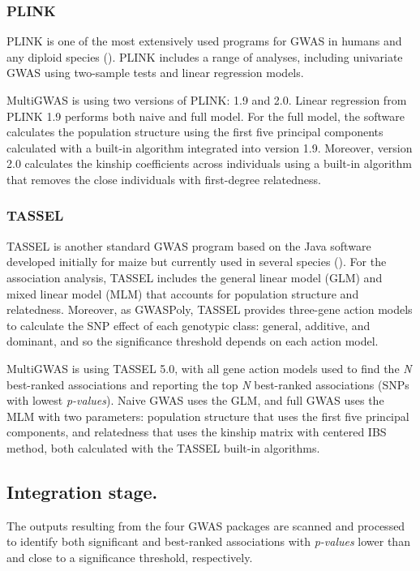 \documentclass{article}
\begin{document}
\subsubsection{PLINK}
PLINK is one of the most extensively used programs for GWAS in humans and any diploid species (\cite{Power2016}). PLINK includes a range of analyses, including univariate GWAS using two-sample tests and linear regression models.

MultiGWAS is using two versions of PLINK: 1.9 and 2.0. Linear regression from PLINK 1.9 performs both naive and full model. For the full model, the software calculates the population structure using the first five principal components calculated with a built-in algorithm integrated into version 1.9. Moreover, version 2.0 calculates the kinship coefficients across individuals using a built-in algorithm that removes the close individuals with first-degree relatedness.

\subsubsection{TASSEL}
TASSEL is another standard GWAS program based on the Java software developed initially for maize but currently used in several species (\cite{Alvarez2017,Zhang2018}). For the association analysis, TASSEL includes the general linear model (GLM) and mixed linear model (MLM) that accounts for population structure and relatedness. Moreover, as GWASPoly, TASSEL provides three-gene action models to calculate the SNP effect of each genotypic class: general, additive, and dominant, and so the significance threshold depends on each action model.

MultiGWAS is using TASSEL 5.0, with all gene action models used to find the \emph{N} best-ranked associations and reporting the top \emph{N} best-ranked associations (SNPs with lowest \emph{p-values}). Naive GWAS uses the GLM, and full GWAS uses the MLM with two parameters: population structure that uses the first five principal components, and relatedness that uses the kinship matrix with centered IBS method, both calculated with the TASSEL built-in algorithms. 


\subsection{Integration stage.}
The outputs resulting from the four GWAS packages are scanned and processed to identify both significant and best-ranked associations with \emph{p-values} lower than and close to a significance threshold, respectively. 
\end{document}
